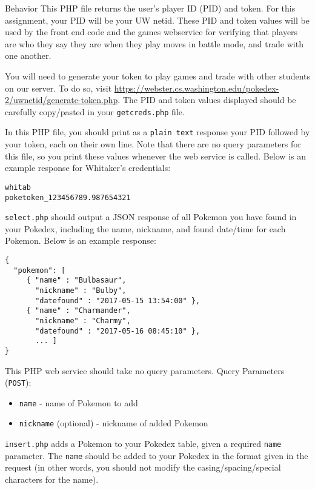 \documentclass[programming]{../../../../mfcs}
\begin{document}
\begin{question}{Behavior}
  This PHP file returns the user's player ID (PID) and token. For this assignment, your PID
  will be your UW netid. These PID and token values will be used by the front end code and the games webservice for
  verifying that players are who they say they are when they play moves in battle mode, and trade with one another.
  \newline

  You will need to generate your token to play games and trade with other students on our server. To do so, visit
  \url{https://webster.cs.washington.edu/pokedex-2/uwnetid/generate-token.php}. The PID and token
  values displayed should be carefully copy/pasted in your \texttt{getcreds.php} file.
  \newline

  In this PHP file, you should print as a \texttt{plain text} response your PID followed by your
  token, each on their own line. Note that there are no query parameters for this file, so you
  print these values whenever the web service is called. Below is an example response for Whitaker's credentials:
\begin{verbatim}
whitab
poketoken_123456789.987654321\end{verbatim}

  \texttt{select.php} should output a JSON response of all Pokemon you have found in your Pokedex, 
  including the name, nickname, and found date/time for each Pokemon. Below is an example response:
\begin{verbatim}
{
  "pokemon": [
     { "name" : "Bulbasaur",
       "nickname" : "Bulby",
       "datefound" : "2017-05-15 13:54:00" },
     { "name" : "Charmander",
       "nickname" : "Charmy",
       "datefound" : "2017-05-16 08:45:10" },
       ... ]
}\end{verbatim}
This PHP web service should take no query parameters.
\newpage
  Query Parameters (\texttt{POST}):
  \begin{itemize}
    \item \texttt{name} - name of Pokemon to add
    \item \texttt{nickname} (optional) - nickname of added Pokemon
  \end{itemize}
  \texttt{insert.php} adds a Pokemon to your Pokedex table, given a required \texttt{name}
  parameter. The \texttt{name} should be added to your Pokedex in the format given in the request (in
  other words, you should not modify the casing/spacing/special characters for the name).
  \newline


\end{question}
\end{document}
